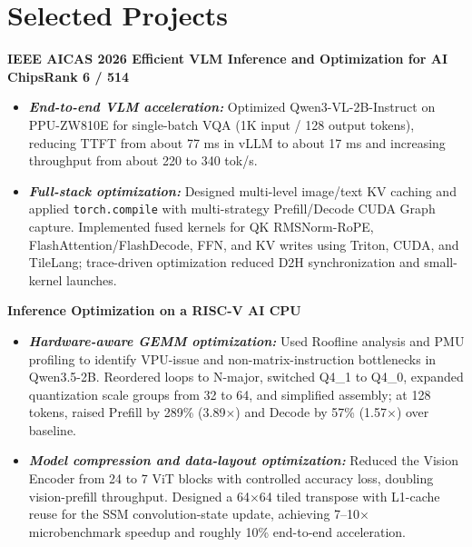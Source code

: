 \documentclass[10pt,a4paper]{article}
\newcommand{\dates}[1]{\hfill\textbf{#1}}
\newcommand{\role}[1]{{\bfseries\fontsize{11pt}{13pt}\selectfont #1}}
\newcommand{\project}[1]{{\bfseries\itshape #1}}
\begin{document}
\section*{Selected Projects}
\role{IEEE AICAS 2026 \textbar{} Efficient VLM Inference and Optimization for AI Chips}\dates{Rank 6 / 514}
\begin{itemize}
    \item \project{End-to-end VLM acceleration:} Optimized Qwen3-VL-2B-Instruct on PPU-ZW810E for single-batch VQA (1K input / 128 output tokens), reducing TTFT from about 77 ms in vLLM to about 17 ms and increasing throughput from about 220 to 340 tok/s.
    \item \project{Full-stack optimization:} Designed multi-level image/text KV caching and applied \texttt{torch.compile} with multi-strategy Prefill/Decode CUDA Graph capture. Implemented fused kernels for QK RMSNorm-RoPE, FlashAttention/FlashDecode, FFN, and KV writes using Triton, CUDA, and TileLang; trace-driven optimization reduced D2H synchronization and small-kernel launches.
\end{itemize}

\newpage
\role{Inference Optimization on a RISC-V AI CPU}
\begin{itemize}
    \item \project{Hardware-aware GEMM optimization:} Used Roofline analysis and PMU profiling to identify VPU-issue and non-matrix-instruction bottlenecks in Qwen3.5-2B. Reordered loops to N-major, switched Q4\_1 to Q4\_0, expanded quantization scale groups from 32 to 64, and simplified assembly; at 128 tokens, raised Prefill by 289\% (3.89$\times$) and Decode by 57\% (1.57$\times$) over baseline.
    \item \project{Model compression and data-layout optimization:} Reduced the Vision Encoder from 24 to 7 ViT blocks with controlled accuracy loss, doubling vision-prefill throughput. Designed a 64$\times$64 tiled transpose with L1-cache reuse for the SSM convolution-state update, achieving 7--10$\times$ microbenchmark speedup and roughly 10\% end-to-end acceleration.
\end{itemize}
\end{document}
